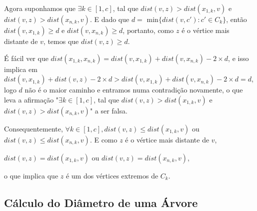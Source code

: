 \documentclass[a4paper,12pt]{article}
\begin{document}
\begin{itemize}
            Agora suponhamos que $\exists k \in [1, c]$, tal que
            $dist(v, z)>dist(x_{1, k}, v)$ e 
            $dist(v, z)>dist(x_{n, k}, v)$.
            E dado que $d=$ min$\{dist(v, c'): c'\in C_k\}$, então
            $dist(v, x_{1, k})\ge d$ e 
            $dist(v, x_{n, k})\ge d$, 
            portanto, como $z$ é o vértice mais distante de $v$, 
            temos que
            $dist(v, z)\ge d$.

            É fácil ver que 
            $dist(x_{1, k}, x_{n, k})=
            dist(v, x_{1, k})+dist(v, x_{n, k})-2\times d$, 
            e isso implica em
            $dist(v, x_{1, k})+dist(v, z)-2\times d>
            dist(v, x_{1, k})+dist(v, x_{n, k})-2\times d=d$, 
            logo $d$ não é o maior caminho e entramos numa 
            contradição novamente, o que leva a afirmação
            "$\exists k \in [1, c]$, tal que
            $dist(v, z)>dist(x_{1, k}, v)$ e 
            $dist(v, z)>dist(x_{n, k}, v)$" a ser falsa.

            Consequentemente, $\forall k \in [1, c], 
            dist(v, z)\le dist(x_{1, k}, v)$ ou
            $dist(v, z)\le dist(x_{n, k}, v)$. 
            E como $z$ é o vértice mais distante de $v$, 
            
            $dist(v, z)=dist(x_{1, k}, v)$ ou 
            $dist(v, z)=dist(x_{n, k}, v)$,

            o que implica que $z$ é um dos vértices extremos de 
            $C_k$.






        \end{itemize}
        
    \subsection{Cálculo do Diâmetro de uma Árvore}
    


\newpage
    
    
    
\end{document}
